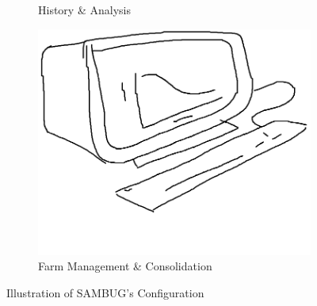 \documentclass[11pt,a4paper,titlepage]{article}
\begin{document}
\begin{figure}[h]
\begin{subfigure}{0.3\textwidth}
		\caption{History \& Analysis}		
		\label{fig:Engine}	
		\end{subfigure}
		\begin{subfigure}{0.3\textwidth}
			\includegraphics[width=0.9\linewidth]{Fig1c}
		\caption{Farm Management \& Consolidation}	
		\label{fig:Web}		
		\end{subfigure}
	\caption{Illustration of SAMBUG's Configuration}
	\label{fig:layout}
	\end{figure}
\end{document}
